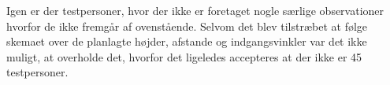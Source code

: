 %
Igen er der testpersoner, hvor der ikke er foretaget nogle særlige observationer hvorfor de ikke fremgår af ovenstående. Selvom det blev tilstræbet at følge skemaet over de planlagte højder, afstande og indgangsvinkler var det ikke muligt, at overholde det, hvorfor det ligeledes accepteres at der ikke er 45 testpersoner. 
\newpage

